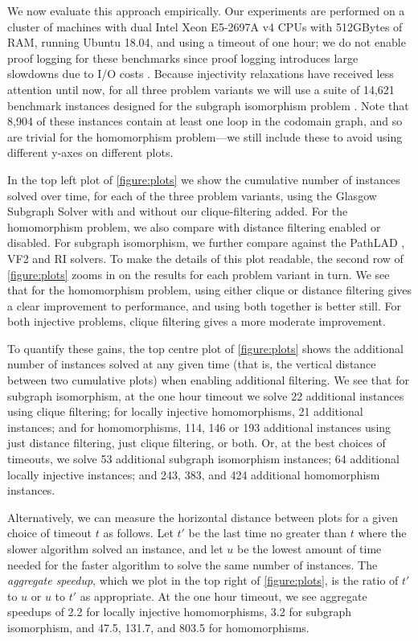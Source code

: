 \documentclass{article}
\begin{document}
We now evaluate this approach empirically. Our experiments are performed on a cluster of machines
with dual Intel Xeon E5-2697A v4 CPUs with 512GBytes of RAM, running Ubuntu 18.04, and using a
timeout of one hour; we do not enable proof logging for these benchmarks since proof logging
introduces large slowdowns due to I/O costs \cite{DBLP:conf/cp/GochtMMNPT20}. Because injectivity
relaxations have received less attention until now, for all three problem variants we will use a
suite of 14,621 benchmark instances designed for the subgraph isomorphism problem
\cite{DBLP:conf/lion/KotthoffMS16}. Note that 8,904 of these instances contain at least one loop in
the codomain graph, and so are trivial for the homomorphism problem---we still include these to
avoid using different y-axes on different plots.

In the top left plot of \cref{figure:plots} we show the cumulative number of instances solved over
time, for each of the three problem variants, using the Glasgow Subgraph Solver with and without our
clique-filtering added. For the homomorphism problem, we also compare with distance filtering
enabled or disabled. For subgraph isomorphism, we further compare against the PathLAD
\cite{DBLP:conf/lion/KotthoffMS16}, VF2 \cite{DBLP:journals/pami/CordellaFSV04} and RI
\cite{DBLP:journals/bmcbi/BonniciGPSF13} solvers. To make the details of this plot readable, the
second row of \cref{figure:plots} zooms in on the results for each
problem variant in turn. We see that for the homomorphism problem, using either clique or
distance filtering gives a clear improvement to performance, and using both together is better
still. For both injective problems, clique filtering gives a more moderate improvement.

To quantify these gains, the top centre plot of \cref{figure:plots} shows the
additional number of instances solved at any given time (that is, the vertical distance between
two cumulative plots) when enabling additional filtering. We see that for subgraph isomorphism, at
the one hour timeout we solve 22 additional instances using clique filtering; for locally injective
homomorphisms, 21 additional instances; and for homomorphisms, 114, 146 or 193 additional instances
using just distance filtering, just clique filtering, or both. Or, at the best choices of timeouts,
we solve 53 additional subgraph isomorphism instances; 64 additional locally injective instances;
and 243, 383, and 424 additional homomorphism instances.

Alternatively, we can measure the horizontal distance between plots for a given choice of timeout
$t$ as follows. Let $t'$ be the last time no greater than $t$ where the slower algorithm solved an
instance, and let $u$ be the lowest amount of time needed for the faster algorithm to solve the same
number of instances.  The \emph{aggregate speedup}, which we plot in the top right of
\cref{figure:plots}, is the ratio of $t'$ to $u$ or $u$ to $t'$ as appropriate. At the one hour
timeout, we see aggregate speedups of 2.2 for locally injective homomorphisms, 3.2 for subgraph
isomorphism, and 47.5, 131.7, and 803.5 for homomorphisms.
\end{document}
